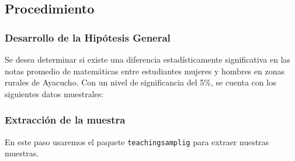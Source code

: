 \documentclass[
]{article}
\newenvironment{Shaded}{\begin{snugshade}}{\end{snugshade}}
\newcommand{\DecValTok}[1]{\textcolor[rgb]{0.00,0.00,0.81}{#1}}
\newcommand{\FunctionTok}[1]{\textcolor[rgb]{0.13,0.29,0.53}{\textbf{#1}}}
\newcommand{\NormalTok}[1]{#1}
\newcommand{\OtherTok}[1]{\textcolor[rgb]{0.56,0.35,0.01}{#1}}
\newcommand{\SpecialCharTok}[1]{\textcolor[rgb]{0.81,0.36,0.00}{\textbf{#1}}}
\newcommand{\StringTok}[1]{\textcolor[rgb]{0.31,0.60,0.02}{#1}}
\begin{document}
\subsection*{Procedimiento}\label{procedimiento}

\subsubsection*{Desarrollo de la Hipótesis
General}\label{desarrollo-de-la-hipuxf3tesis-general}

Se desea determinar si existe una diferencia estadísticamente
significativa en las notas promedio de matemáticas entre estudiantes
mujeres y hombres en zonas rurales de Ayacucho. Con un nivel de
significancia del 5\%, se cuenta con los siguientes datos muestrales:

\subsubsection*{Extracción de la
muestra}\label{extracciuxf3n-de-la-muestra}

En este paso usaremos el paquete \texttt{teachingsamplig} para extraer
nuestras muestras.

\begin{Shaded}
\end{Shaded}
\end{document}
